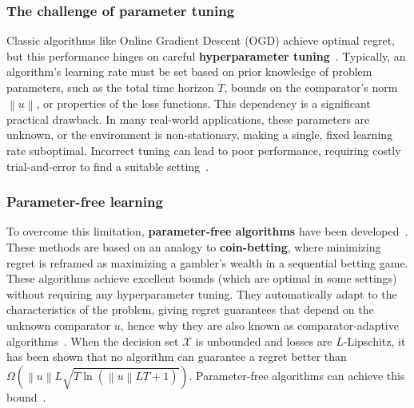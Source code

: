 \documentclass[journal]{IEEEtran} %
\newcommand{\br}[1]{\left(#1\right)}
\newcommand{\norm}[1]{\left\lVert{#1}\right\rVert}
\begin{document}
\subsubsection*{The challenge of parameter tuning}
Classic algorithms like Online Gradient Descent (OGD) achieve optimal regret, but this performance hinges on careful \textbf{hyperparameter tuning}~\cite{hazan_introduction_2023}.
Typically, an algorithm's learning rate must be set based on prior knowledge of problem parameters, such as the total time horizon $T$, bounds on the comparator's norm $\norm{u}$, or properties of the loss functions.
This dependency is a significant practical drawback.
In many real-world applications, these parameters are unknown, or the environment is non-stationary, making a single, fixed learning rate suboptimal.
Incorrect tuning can lead to poor performance, requiring costly trial-and-error to find a suitable setting~\cite{orabona_coin_2016}.

\subsubsection*{Parameter-free learning}
To overcome this limitation, \textbf{parameter-free algorithms} have been developed~\cite{mcmahan_no-regret_2012,mcmahan_unconstrained_2014,orabona_coin_2016,cutkosky_online_2017}.
These methods are based on an analogy to \textbf{coin-betting}, where minimizing regret is reframed as maximizing a gambler's wealth in a sequential betting game.
These algorithms achieve excellent bounds (which are optimal in some settings) without requiring any hyperparameter tuning.
They automatically adapt to the characteristics of the problem, giving regret guarantees that depend on the unknown comparator $u$, hence why they are also known as comparator-adaptive algorithms~\cite{van_der_hoeven_comparator-adaptive_2020, hoeven_distributed_2021}.
When the decision set $\mathcal{X}$ is unbounded and losses are $L$-Lipschitz, it has been shown that no algorithm can guarantee a regret better than $\Omega\br{\norm{u}L \sqrt{T \ln(\norm{u} LT + 1)}}$.
Parameter-free algorithms can achieve this bound~\cite{mcmahan_no-regret_2012}.
\end{document}
